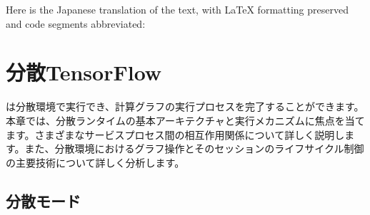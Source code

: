 Here is the Japanese translation of the text, with LaTeX formatting preserved and code segments abbreviated:

\begin{savequote}[45mm]
\end{savequote}

\chapter{分散TensorFlow} 
\label{ch:distributed}

\begin{content}

\tf{}は分散環境で実行でき、計算グラフの実行プロセスを完了することができます。本章では、分散ランタイムの基本アーキテクチャと実行メカニズムに焦点を当てます。さまざまなサービスプロセス間の相互作用関係について詳しく説明します。また、分散環境におけるグラフ操作とそのセッションのライフサイクル制御の主要技術について詳しく分析します。

\end{content}

\section{分散モード}

